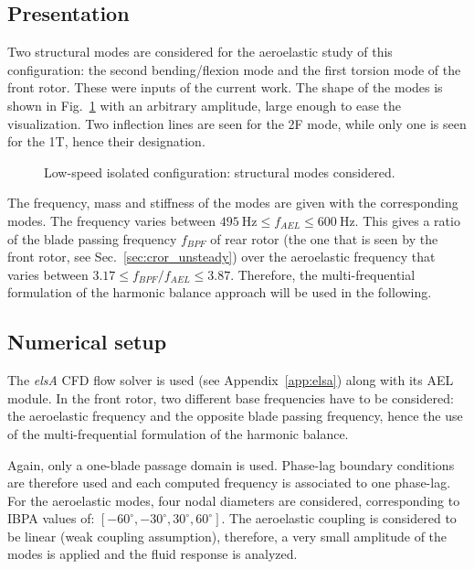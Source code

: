 
\subsection{Presentation}
\label{sub:dream_ls_ael_presentation}

Two structural modes are considered for the aeroelastic study of this 
configuration: the second bending/flexion mode and the first torsion mode
of the front rotor. These were inputs of the current work.
The shape of the modes is shown in Fig.~\ref{fig:dream_ls_ael_modes}
with an arbitrary amplitude, large enough to ease the visualization.
Two inflection lines are seen for the 2F mode, while only
one is seen for the 1T, hence their designation.
\begin{figure}[htp]
  \centering
  \caption{Low-speed isolated configuration: structural modes considered.}
  \label{fig:dream_ls_ael_modes}
\end{figure}
The frequency, mass and stiffness of the modes 
are given with the corresponding modes.
The frequency varies between 
$495~\textrm{Hz} \leq f_{AEL} \leq 600~\textrm{Hz}$.
This gives a ratio of the
blade passing frequency $f_{BPF}$ of rear rotor (the one that is
seen by the front rotor, see Sec.~\ref{sec:cror_unsteady})
over the aeroelastic frequency that 
varies between $3.17 \leq f_{BPF} / f_{AEL} \leq 3.87$.
Therefore, the multi-frequential formulation of the
harmonic balance approach will be used in the following.

\subsection{Numerical setup}
\label{sub:dream_ls_ael_number}

The \emph{elsA} CFD flow solver is 
used (see Appendix~\ref{app:elsa}) along with its AEL module.
In the front rotor, two different base frequencies have to
be considered: the aeroelastic frequency and the
opposite blade passing frequency, hence the use of
the multi-frequential formulation of the harmonic balance.

Again, only a one-blade passage domain is used.
Phase-lag boundary conditions are therefore used
and each computed frequency is associated to one phase-lag.
For the aeroelastic modes, 
four nodal diameters are considered, corresponding to IBPA
values of: $[-60^\circ, -30^\circ, 30^\circ, 60^\circ]$. 
The aeroelastic coupling is considered to be linear (weak coupling
assumption), therefore, a very small amplitude of the modes is applied
and the fluid response is analyzed.


